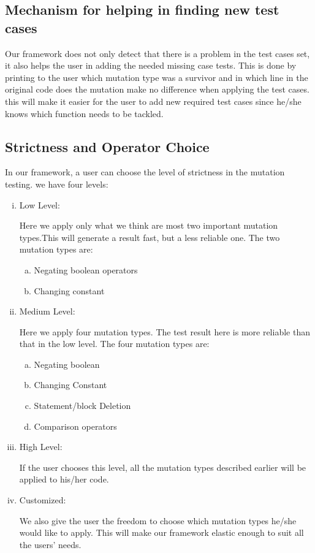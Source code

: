 \documentclass{acm_proc_article-sp}
\begin{document}
\subsection{Mechanism for helping in finding new test cases}

Our framework does not only detect that there is a problem in the test cases set, it also helps the user in adding the needed missing case tests. This is done by printing to the user which mutation type was a survivor and in which line in the original code does the mutation make no difference when applying the test cases. this will make it easier for the user to add new required test cases since he/she knows which function needs to be tackled.

\subsection{Strictness and Operator Choice}

In our framework, a user can choose the level of strictness in the mutation testing. we have four levels:
\begin{enumerate}[i)]
\item Low Level:

Here we apply only what we think are most two important mutation types.This will generate a result fast, but a less reliable one. The two mutation types are:
\begin{enumerate}[a)]
\item Negating boolean operators
\item Changing constant
\end{enumerate}

\item Medium Level:

Here we apply four mutation types. The test result here is more reliable than that in the low level. The four mutation types are:

\begin{enumerate}[a)]
\item Negating boolean 
\item Changing Constant  
\item Statement/block Deletion
\item Comparison operators
\end{enumerate}

\item High Level:

If the user chooses this level, all the mutation types described earlier will be applied to his/her code.

\item Customized:

We also give the user the freedom to choose which mutation types he/she would like to apply. This will make our framework elastic enough to suit all the users' needs.

\end{enumerate}
\end{document}
